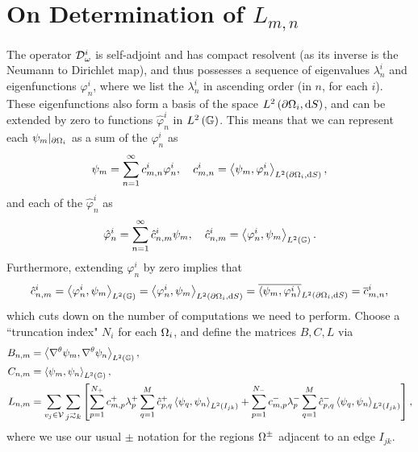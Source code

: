 \section{On Determination of $L_{m,n}$} \label{sec:SIApp-NonLocalSolve}
The operator $\mathcal{D}_{\omega}^i$ is self-adjoint and has compact resolvent (as its inverse is the Neumann to Dirichlet map), and thus possesses a sequence of eigenvalues $\lambda^i_n$ and eigenfunctions $\varphi_n^i$, where we list the $\lambda^i_n$ in ascending order (in $n$, for each $i$).
These eigenfunctions also form a basis of the space $L^{2}\left( \partial\Omega_i,\mathrm{d} S \right)$, and can be extended by zero to functions $\hat{\varphi}_n^i$ in $L^2\left( \mathbb{G} \right)$.
This means that we can represent each $\psi_m\vert_{\partial\Omega_i}$ as a sum of the $\varphi_n^i$ as
\begin{align*}
	\psi_m = \sum_{n=1}^{\infty} c_{m,n}^i \varphi_n^i, \quad c_{m,n}^i = \left\langle \psi_m , \varphi_n^i \right\rangle_{L^{2}\left( \partial\Omega_i,\mathrm{d} S \right)},
\end{align*}
and each of the $\hat{\varphi}_n^i$ as
\begin{align*}
	\hat{\varphi}_n^i = \sum_{n=1}^{\infty} \hat{c}_{n,m}^i \psi_m, \quad \hat{c}_{n,m}^i = \left\langle \varphi_n^i , \psi_m \right\rangle_{L^2\left( \mathbb{G} \right)}.
\end{align*}
Furthermore, extending $\varphi_n^i$ by zero implies that
\begin{align*}
	\hat{c}_{n,m}^i = \left\langle \varphi_n^i , \psi_m \right\rangle_{L^2\left( \mathbb{G} \right)} = \left\langle \varphi_n^i , \psi_m \right\rangle_{L^{2}\left( \partial\Omega_i,\mathrm{d} S \right)} = \overline{\left\langle \psi_m , \varphi_n^i \right\rangle}_{L^{2}\left( \partial\Omega_i,\mathrm{d} S \right)} = \overline{c}_{m,n}^i,
\end{align*}
which cuts down on the number of computations we need to perform.
Choose a ``truncation index" $N_i$ for each $\Omega_i$, and define the matrices $B, C, L$ via
\begin{align*}
	B_{n,m} &= \ip{\tgrad\psi_m}{\tgrad\psi_n}_{L^2\bracs{\graph}}, \\
	C_{n,m} &= \ip{\psi_m}{\psi_n}_{L^2\bracs{\graph}}, \\
	L_{n,m} &= \sum_{v_j\in\vertSet}\sum_{j\conLeft k}
	\sqbracs{ \sum_{p=1}^{N_+}c_{m,p}^+\lambda^+_p \sum_{q=1}^M \hat{c}_{p,q}^+ \ip{\psi_q}{\psi_n}_{L^2\bracs{I_{jk}}} + \sum_{p=1}^{N_-}c_{m,p}^-\lambda^-_p \sum_{q=1}^M \hat{c}_{p,q}^- \ip{\psi_q}{\psi_n}_{L^2\bracs{I_{jk}}} },
\end{align*}
where we use our usual $\pm$ notation for the regions $\Omega^{\pm}$ adjacent to an edge $I_{jk}$.
